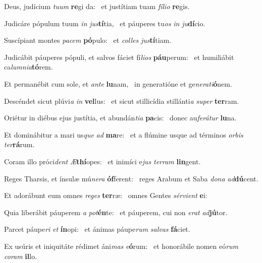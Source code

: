 \item Deus, judícium \textit{tu}\textit{um} \textbf{re}gi da:~\psstar{} et justítiam tuam \textit{fí}\textit{li}\textit{o} \textbf{re}gis.
\item Judicáre pópulum tuum \textit{in} \textit{jus}\textbf{tí}tia,~\psstar{} et páuperes tu\textit{os} \textit{in} \textit{ju}\textbf{dí}cio.
\item Suscípiant montes \textit{pa}\textit{cem} \textbf{pó}pulo:~\psstar{} et \textit{col}\textit{les} \textit{jus}\textbf{tí}tiam.
\item Judicábit páuperes pópuli, et salvos fáciet fí\textit{li}\textit{os} \textbf{páu}perum:~\psstar{} et humiliábit ca\textit{lum}\textit{ni}\textit{a}\textbf{tó}rem.
\item Et permanébit cum sole, et \textit{an}\textit{te} \textbf{lu}nam,~\psstar{} in generatióne et ge\textit{ne}\textit{ra}\textit{ti}\textbf{ó}nem.
\item Descéndet sicut plúvi\textit{a} \textit{in} \textbf{vel}lus:~\psstar{} et sicut stillicídia stillánti\textit{a} \textit{su}\textit{per} \textbf{ter}ram.
\item Oriétur in diébus ejus justítia, et abundán\textit{ti}\textit{a} \textbf{pa}cis:~\psstar{} donec au\textit{fe}\textit{rá}\textit{tur} \textbf{lu}na.
\item Et dominábitur a mari us\textit{que} \textit{ad} \textbf{ma}re:~\psstar{} et a flúmine usque ad términos \textit{or}\textit{bis} \textit{ter}\textbf{rá}rum.
\item Coram illo próci\textit{dent} \textit{Æ}\textbf{thí}opes:~\psstar{} et inimíci e\textit{jus} \textit{ter}\textit{ram} \textbf{lin}gent.
\item Reges Tharsis, et ínsulæ mú\textit{ne}\textit{ra} \textbf{óf}ferent:~\psstar{} reges Arabum et Saba \textit{do}\textit{na} \textit{ad}\textbf{dú}cent.
\item Et adorábunt eum omnes \textit{re}\textit{ges} \textbf{ter}ræ:~\psstar{} omnes Gentes \textit{sér}\textit{vi}\textit{ent} \textbf{e}i:
\item Quia liberábit páuperem \textit{a} \textit{pot}\textbf{én}te:~\psstar{} et páuperem, cui non \textit{e}\textit{rat} \textit{ad}\textbf{jú}tor.
\item Parcet páupe\textit{ri} \textit{et} \textbf{ín}opi:~\psstar{} et ánimas páupe\textit{rum} \textit{sal}\textit{vas} \textbf{fá}ciet.
\item Ex usúris et iniquitáte rédimet áni\textit{mas} \textit{e}\textbf{ó}rum:~\psstar{} et honorábile nomen eó\textit{rum} \textit{co}\textit{ram} \textbf{il}lo.
